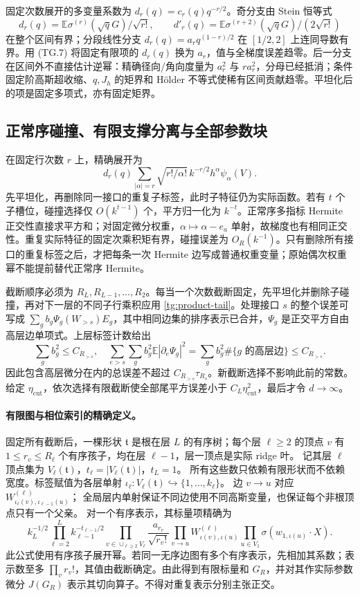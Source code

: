 \documentclass[a4paper]{tufte-handout}
\newcommand{\ecut}{\eta_{\mathrm{cut}}}
\begin{document}
\begin{fullwidth}
固定次数展开的多变量系数为 $d_r(q)=c_r(q)q^{-r/2}$。奇分支由 Stein 恒等式
\[
 d_r(q)=\mathbb E\sigma^{(r)}(\sqrt qG)/\sqrt{r!},\qquad
 d'_r(q)=\mathbb E\sigma^{(r+2)}(\sqrt qG)/(2\sqrt{r!})
\]
在整个区间有界；分段线性分支 $d_r(q)=a_rq^{(1-r)/2}$ 在 $[1/2,2]$ 上连同导数有界。用 (TG.7) 将固定有限项的 $d_r(q)$ 换为 $a_r$，值与全梯度误差趋零。后一分支在区间外不直接估计逆幂：精确径向/角向度量为 $a_r^2$ 与 $r a_r^2$，分母已经抵消；条件固定阶高斯超收缩、$q,J_h$ 的矩界和 Hölder 不等式使稀有区间贡献趋零。平坦化后的项是固定多项式，亦有固定矩界。

\subsection{正常序碰撞、有限支撑分离与全部参数块}
在固定行次数 $r$ 上，精确展开为
\[
 d_r(q)\sum_{|\alpha|=r}\sqrt{r!/\alpha!}\,k^{-r/2}h^\alpha\psi_\alpha(V).
 \tag{TG.8}
\]
先平坦化，再删除同一接口的重复子标签，此时子特征仍为实际函数。若有 $t$ 个子槽位，碰撞选择仅 $O(k^{t-1})$ 个，平方归一化为 $k^{-t}$。正常序多指标 Hermite 正交性直接求平方和；对固定微分权重，$\alpha\mapsto\alpha-e_a$ 单射，故梯度也有相同正交性。重复实际特征的固定次乘积矩有界，碰撞误差为 $O_R(k^{-1})$。只有删除所有接口的重复标签之后，才把每条一次 Hermite 边写成普通权重变量；原始偶次权重幂不能提前替代正常序 Hermite。

截断顺序必须为 $R_L,R_{L-1},\ldots,R_2$。每当一个次数截断固定，先平坦化并删除子碰撞，再对下一层的不同子行乘积应用 \eqref{tg:product-tail}。处理接口 $s$ 的整个误差可写成
$\sum_gb_g\Psi_g(W_{>s})E_g$，其中相同边集的排序表示已合并，$\Psi_g$ 是正交平方自由高层边单项式。上层标签计数给出
\[
 \sum_gb_g^2\le C_{R_{>s}},\quad
 \sum_{e>s}\sum_gb_g^2\mathbb E|\partial_e\Psi_g|^2
 =\sum_gb_g^2\#\{g\text{ 的高层边}\}\le C_{R_{>s}}.
\]
因此包含高层微分在内的总误差不超过 $C_{R_{>s}}\tau_{R_s}$。新截断选择不影响此前的常数。给定 $\ecut$，依次选择有限截断使全部尾平方误差小于 $C_L\ecut^2$，最后才令 $d\to\infty$。

\paragraph{有限图与相位索引的精确定义。}
固定所有截断后，一棵形状 $\mathfrak t$ 是根在层 $L$ 的有序树；每个层 $\ell\ge2$ 的顶点
$v$ 有 $1\le r_v\le R_\ell$ 个有序孩子，均在层 $\ell-1$，层一顶点是实际 ridge 叶。
记其层 $\ell$ 顶点集为 $V_\ell(\mathfrak t)$，$t_\ell=|V_\ell(\mathfrak t)|$，$t_L=1$。
所有这些数只依赖有限形状而不依赖宽度。标签赋值为各层单射
$\iota_\ell:V_\ell(\mathfrak t)\hookrightarrow\{1,\ldots,k_\ell\}$。
边 $v\to u$ 对应 $W^{(\ell)}_{\iota_\ell(v),\iota_{\ell-1}(u)}$；
全局层内单射保证不同边使用不同高斯变量，也保证每个非根顶点只有一个父亲。
对一个有序表示，其标量项精确为
\[
 k_L^{-1/2}\prod_{\ell=2}^Lk_{\ell-1}^{-t_{\ell-1}/2}
 \prod_{v\in\cup_{\ell\ge2}V_\ell}\frac{a_{r_v}}{\sqrt{r_v!}}
 \prod_{v\to u}W^{(\ell)}_{\iota(v),\iota(u)}
 \prod_{u\in V_1}\sigma(w_{1,\iota(u)}\cdot X).
 \tag{TG.8a}
\]
此公式使用有序孩子展开幂。若同一无序边图有多个有序表示，先相加其系数；表示数至多
$\prod_v r_v!$，其值由截断确定。由此得到有限标量和 $G_R$，并对其作实际参数微分
$J(G_R)$ 表示其切向算子。不得对重复表示分别主张正交。


\end{fullwidth}
\end{document}
